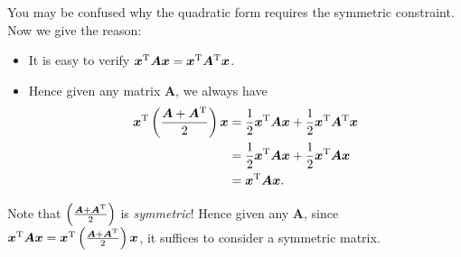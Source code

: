 You may be confused why the quadratic form requires the symmetric constraint. Now we give the reason:
\begin{itemize}
\item
It is easy to verify $\bm x^{\mathrm T}\bm A\bm x=\bm x^{\mathrm T}\bm A^{\mathrm T}\bm x$.
\item
Hence given any matrix $\bm A$, we always have
\begin{align*}
\bm x^{\mathrm T}\left(\frac{\bm A+\bm A^{\mathrm T}}{2}\right)\bm x&=\frac{1}{2}\bm x^{\mathrm T}\bm A\bm x+\frac{1}{2}\bm x^{\mathrm T}\bm A^{\mathrm T}\bm x\\&=\frac{1}{2}\bm x^{\mathrm T}\bm A\bm x+\frac{1}{2}\bm x^{\mathrm T}\bm A\bm x\\&=\bm x^{\mathrm T}\bm A\bm x.
\end{align*}
\end{itemize}
Note that $\left(\frac{\bm A+\bm A^{\mathrm T}}{2}\right)$ is \textit{symmetric}! Hence given any $\bm A$, since $\bm x^{\mathrm T}\bm A\bm x=\bm x^{\mathrm T}\left(\frac{\bm A+\bm A^{\mathrm T}}{2}\right)\bm x$, it suffices to consider a symmetric matrix.
